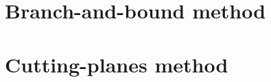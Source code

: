 \documentclass{bookest}
\begin{document}
	\chapter{Branch-and-bound method} \label{chapter_9}
	
	
	\chapter{Cutting-planes method} \label{chapter_10}
	
		
	
%		
%	
%	
%	
%	
%	
%	
%	
%	
%	
%	
%	
%	
%		
%	
%		
%	
%	
%	
%	
%	
%	
%	
\end{document}
